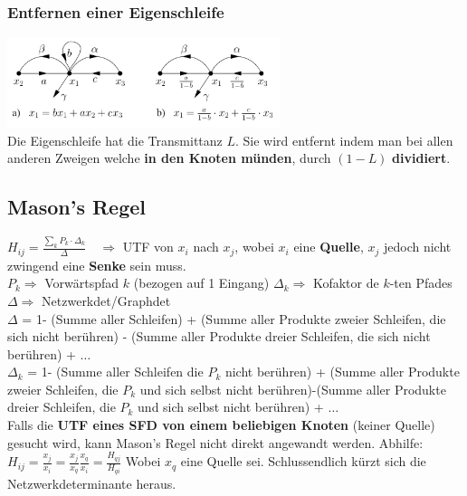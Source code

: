 \begin{multicols}{2}
    \subsubsection{Entfernen einer Eigenschleife}
      \includegraphics[width=8cm]{./images/eigenschleife.png} \\
      Die Eigenschleife hat die Transmittanz $L$. Sie wird entfernt indem man bei allen anderen
      Zweigen welche \textbf{in den Knoten münden}, durch $(1-L)$ \textbf{dividiert}.
 \end{multicols}
 
\newpage 

\subsection{Mason's Regel }
  $\boxed{H_{ij} = \frac{\sum\limits_k P_k\cdot\Delta_k}{\Delta}}\quad
  \Rightarrow$ UTF von $x_i$ nach $x_j$, wobei \textbf{$x_i$} eine
  \textbf{Quelle}, \textbf{$x_j$} jedoch nicht zwingend eine \textbf{Senke} sein
  muss. \vspace{0.3cm}\\
  $P_k \Rightarrow$ Vorwärtspfad $k$ (bezogen auf 1 Eingang) \qquad $\Delta_k \Rightarrow$ Kofaktor de
  $k$-ten Pfades \qquad $\Delta \Rightarrow$ Netzwerkdet/Graphdet\vspace{0.3cm}\\
  $\Delta$ = 1- (Summe aller Schleifen) + (Summe aller Produkte zweier
  Schleifen, die sich nicht berühren) - (Summe
  aller Produkte dreier Schleifen, die sich nicht berühren) + $\ldots$
  \vspace{0.3cm}\\
  $\Delta_k$ = 1- (Summe aller Schleifen die $P_k$ nicht berühren) + (Summe
  aller Produkte zweier Schleifen, die $P_k$ und sich selbst nicht
  berühren)-(Summe aller Produkte dreier Schleifen, die $P_k$ und sich selbst
  nicht berühren) + $\ldots$ \\

  Falls die \textbf{UTF eines SFD von einem beliebigen Knoten} (keiner Quelle)
  gesucht wird, kann Mason's Regel nicht direkt angewandt werden. Abhilfe: \\
  $\boxed{H_{ij} = \frac{x_j}{x_i} = \frac{x_j}{x_q} \frac{x_q}{x_i} =
  \frac{H_{qj}}{H_{qi}}}$ Wobei $x_q$ eine Quelle sei. 
  Schlussendlich kürzt sich die Netzwerkdeterminante heraus.


